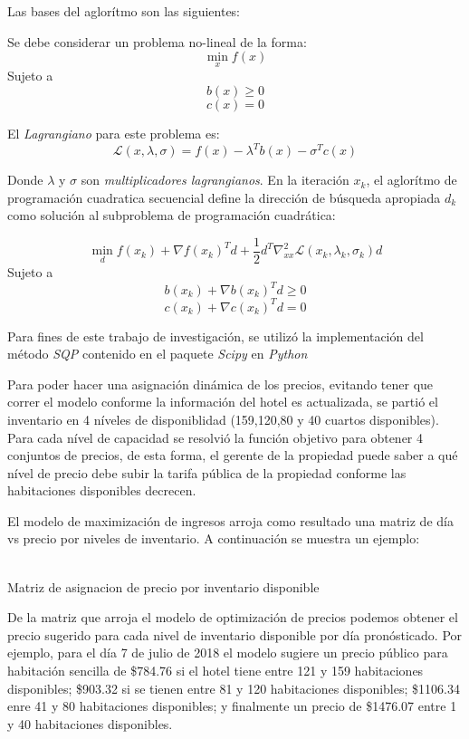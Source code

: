 Las bases del aglorítmo son las siguientes:

Se debe considerar un problema no-lineal de la forma: $$\min_x f(x)$$ Sujeto a $$b(x) \geq 0$$ $$c(x) = 0$$

El \emph{Lagrangiano} para este problema es: $$\mathcal{L}(x,\lambda,\sigma)=f(x)-\lambda^Tb(x)-\sigma^Tc(x)$$

Donde $\lambda$ y $\sigma$ son \emph{multiplicadores lagrangianos}. En la iteración $x_k$, el aglorítmo de programación cuadratica secuencial define la dirección de búsqueda apropiada $d_k$ como solución al subproblema de programación cuadrática: 

$$\min_d f(x_k) + \nabla f(x_k)^T d + \frac{1}{2}d^T \nabla_{xx}^2 \mathcal{L} (x_k,\lambda_k,\sigma_k)d$$
Sujeto a
$$b(x_k) + \nabla b(x_k)^T d\geq 0$$
$$c(x_k) + \nabla c(x_k)^T d = 0$$

Para fines de este trabajo de investigación, se utilizó la implementación del método \emph{SQP} contenido en el paquete \emph{Scipy} en  \emph{Python}

Para poder hacer una asignación dinámica de los precios, evitando tener que correr el modelo conforme la información del hotel es actualizada, se partió el inventario en 4 níveles de disponiblidad (159,120,80 y 40 cuartos disponibles). Para cada nível de capacidad se resolvió la función objetivo para obtener 4 conjuntos de precios, de esta forma, el gerente de la propiedad puede saber a qué nível de precio debe subir la tarifa pública de la propiedad conforme las habitaciones disponibles decrecen.

El modelo de maximización de ingresos arroja como resultado una matriz de día vs precio por niveles de inventario. A continuación se muestra un ejemplo:
\\
\\

\begin{table}[H]
  \centering
  \par
  \caption{Matriz de asignacion de precio por inventario disponible} 
\end{table}

De la matriz que arroja el modelo de optimización de precios podemos obtener el precio sugerido para cada nivel de inventario disponible por día pronósticado. Por ejemplo, para el día 7 de julio de 2018 el modelo sugiere un precio público para habitación sencilla de \$784.76 si el hotel tiene entre 121 y 159 habitaciones disponibles; \$903.32 si se tienen entre 81 y 120 habitaciones disponibles; \$1106.34 enre 41 y 80 habitaciones disponibles; y finalmente un precio de \$1476.07 entre 1 y 40 habitaciones disponibles.

